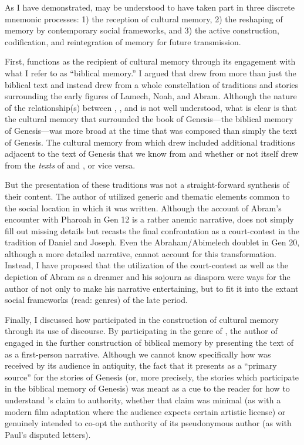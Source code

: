 As I have demonstrated, \ga may be understood to have taken part in three discrete mnemonic processes: 1) the reception of cultural memory, 2) the reshaping of memory by contemporary social frameworks, and 3) the active construction, codification, and reintegration of memory for future transmission. 

First, \ga functions as the recipient of cultural memory through its engagement with what I refer to as  ``biblical memory.'' I argued that \ga drew from more than just the biblical text and instead drew from a whole constellation of traditions and stories surrounding the early figures of Lamech, Noah, and Abram. Although the nature of the relationship(s) between \firstenoch, \jub, and \ga is not well understood, what is clear is that the cultural memory that surrounded the book of Genesis---the biblical memory of Genesis---was more broad at the time that \ga was composed than simply the text of Genesis. The cultural memory from which \ga drew included additional traditions adjacent to the text of Genesis that we know from \jub and \firstenoch whether or not \ga itself drew from the \emph{texts} of \jub and \firstenoch, or vice versa.


But the presentation of these traditions was not a straight-forward synthesis of their content. The author of \ga utilized generic and thematic elements common to the social location in which it was written. Although the account of Abram's encounter with Pharoah in Gen 12 is a rather anemic narrative, \ga does not simply fill out missing details but recasts the final confrontation as a court-contest in the tradition of Daniel and Joseph. Even the Abraham/Abimelech doublet in Gen 20, although a more detailed narrative, cannot account for this transformation. Instead, I have proposed that the utilization of the court-contest as well as the depiction of Abram as a dreamer and his sojourn as diaspora were ways for the author of \ga not only to make his narrative entertaining, but to fit it into the extant social frameworks (read: genres) of the late \secondtemple period.

Finally, I discussed how \ga participated in the construction of cultural memory through its use of \psgraphical discourse. By participating in the genre of \psy, the author of \ga engaged in the further construction of biblical memory by presenting the text of \ga as a first-person narrative. Although we cannot know specifically how \ga was received by its audience in antiquity, the fact that it presents as a ``primary source'' for the stories of Genesis (or, more precisely, the stories which participate in the biblical memory of Genesis) was meant as a cue to the reader for how to understand \ga's claim to authority, whether that claim was minimal (as with a modern film adaptation where the audience expects certain artistic license) or genuinely intended to co-opt the authority of its pseudonymous author (as with Paul's disputed letters).

